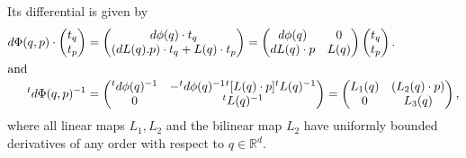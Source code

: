 \documentclass[AHL,Unicode,longabstracts]{cedram}
\newcommand{\R}{\mathbb{R}}
\begin{document}
Its differential is given by
\begin{align*}
d\Phi(q,p)\cdot
\begin{pmatrix}
t_{q}\\t_{p}
\end{pmatrix}
&=
\begin{pmatrix}
d\phi(q)\cdot t_{q}\\
(dL(q).p)\cdot t_{q}+L(q)\cdot t_{p}
\end{pmatrix} =
\begin{pmatrix}
d\phi(q)&0\\
dL(q)\cdot p&L(q)
\end{pmatrix}
\begin{pmatrix}
t_{q}\\
t_{p}
\end{pmatrix}.
\\
\intertext{and}
{}^{t}d\Phi(q,p)^{-1} &=
\begin{pmatrix}
{}^{t}d\phi(q)^{-1}& -{}^{t}d\phi(q)^{-1}{}^{t}[L(q)\cdot p]{}^{t}L(q)^{-1}\\
0& {}^{t}L(q)^{-1}
\end{pmatrix} =
\begin{pmatrix}
L_{1}(q)& (L_{2}(q)\cdot p)\\
0&L_{3}(q)
\end{pmatrix},
\end{align*}
where all linear maps $L_{1},L_{2}$ and the bilinear map $L_{2}$ have uniformly bounded derivatives of any order with respect to $q\in \R^{d}$.
\end{document}
